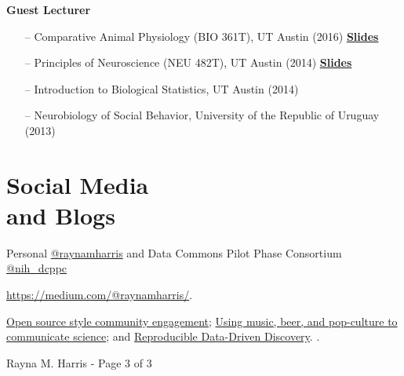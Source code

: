 \documentclass[margin,line]{CV}
\begin{document}
\begin{resume}
{\bf Guest Lecturer}
\begin{itemize}
\item[--] Comparative Animal Physiology (BIO 361T), UT Austin (2016) \href{https://www.slideshare.net/raynamharris/evolution-of-social-brains}{\textbf{Slides}}
\item[--] Principles of Neuroscience (NEU 482T), UT Austin (2014) \href{https://www.slideshare.net/raynamharris/harris-rm-2014-sensory-integration-and-behavior}{\textbf{Slides}}
\item[--] Introduction to Biological Statistics, UT Austin (2014)
\item[--] Neurobiology of Social Behavior, University of the Republic of Uruguay (2013)
\end{itemize}



\section{\mysidestyle Social Media\\and Blogs}

\begin{description}{}{
\setlength{\leftmargin}{1cm}%
\setlength{\itemindent}{-1cm}
}
\setlength{\itemsep}{3pt}
\item[Twitter:] Personal \href{http://twitter.com/raynamharris}{@raynamharris} and Data Commons Pilot Phase Consortium \href{https://twitter.com/nih_dcppc}{@nih\_dcppc}
\item[Professional/personal blog:] \url{https://medium.com/@raynamharris/}. \item[Selected blog posts:] 
\href{https://medium.com/@raynamharris/open-source-style-community-engagement-for-the-data-commons-pilot-phase-consortium-f959abe7c0c5}{Open source style community engagement};
\href{https://medium.com/@raynamharris/zombie-brains-microbial-mind-control-8f3c507255dc}{Using music, beer, and pop-culture to communicate science}; and
\href{https://medium.com/@raynamharris/reproducible-data-driven-discovery-decbf1de2f46#.c63q0cget}{Reproducible Data-Driven Discovery}.
.

\end{description}



\vspace{0.3 cm}
{\centerline {Rayna M. Harris - Page 3 of 3}}

\end{resume}
\end{document}
